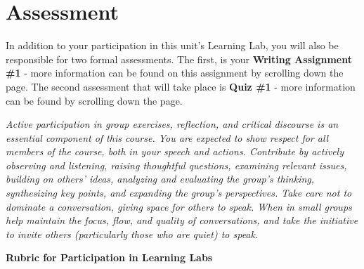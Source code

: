 \documentclass[
]{book}
\begin{document}
\hypertarget{assessment-3}{%
\section{Assessment}\label{assessment-3}}

\begin{assessment}
In addition to your participation in this unit's Learning Lab, you will also be responsible for two formal assessments. The first, is your \textbf{Writing Assignment \#1} - more information can be found on this assignment by scrolling down the page. The second assessment that will take place is \textbf{Quiz \#1} - more information can be found by scrolling down the page.

\emph{Active participation in group exercises, reflection, and critical discourse is an essential component of this course. You are expected to show respect for all members of the course, both in your speech and actions. Contribute by actively observing and listening, raising thoughtful questions, examining relevant issues, building on others' ideas, analyzing and evaluating the group's thinking, synthesizing key points, and expanding the group's perspectives. Take care not to dominate a conversation, giving space for others to speak. When in small groups help maintain the focus, flow, and quality of conversations, and take the initiative to invite others (particularly those who are quiet) to speak.}

\textbf{Rubric for Participation in Learning Labs}


\end{assessment}
\end{document}
